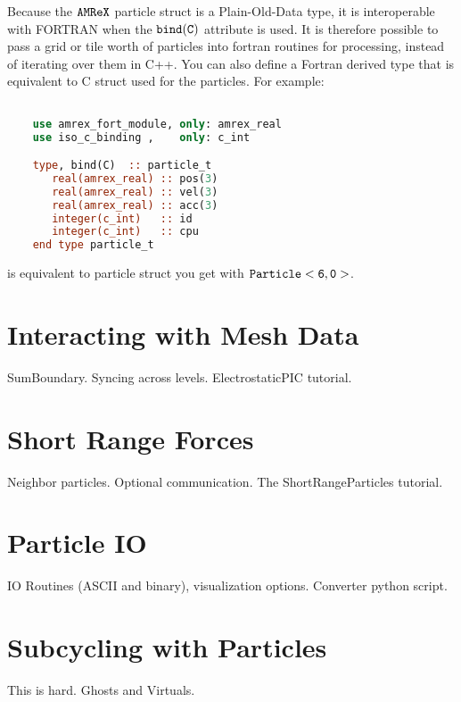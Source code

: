 Because the $\tt{AMReX}$ particle struct is a Plain-Old-Data type, it is interoperable with FORTRAN when the $\tt{bind(C)}$
attribute is used. It is therefore possible to pass a grid or tile worth of particles into fortran routines for processing,
instead of iterating over them in C++. You can also define a Fortran derived type that is equivalent to C struct used for the
particles. For example:

\begin{lstlisting}[language=fortran]

    use amrex_fort_module, only: amrex_real
    use iso_c_binding ,    only: c_int

    type, bind(C)  :: particle_t
       real(amrex_real) :: pos(3)
       real(amrex_real) :: vel(3)
       real(amrex_real) :: acc(3)
       integer(c_int)   :: id
       integer(c_int)   :: cpu
    end type particle_t

\end{lstlisting}

is equivalent to particle struct you get with $\tt{Particle<6, 0>}$.

\section{Interacting with Mesh Data}
\label{sec:Particles:Interacting}

SumBoundary. Syncing across levels. ElectrostaticPIC tutorial.

\section{Short Range Forces}
\label{sec:Particles:ShortRange}

Neighbor particles. Optional communication. The ShortRangeParticles tutorial.

\section{Particle IO}
\label{sec:Particles:IO}

IO Routines (ASCII and binary), visualization options. Converter python script.

\section{Subcycling with Particles}
\label{sec:Particles:Subcycling}

This is hard. Ghosts and Virtuals.  

